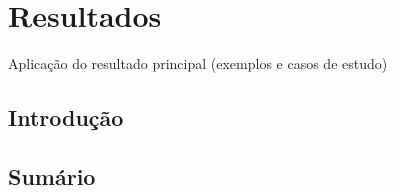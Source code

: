 \chapter{Resultados}
\label{cap_results}


Aplicação do resultado principal (exemplos e casos de estudo)

\section{Introdução}

\section{Sumário}